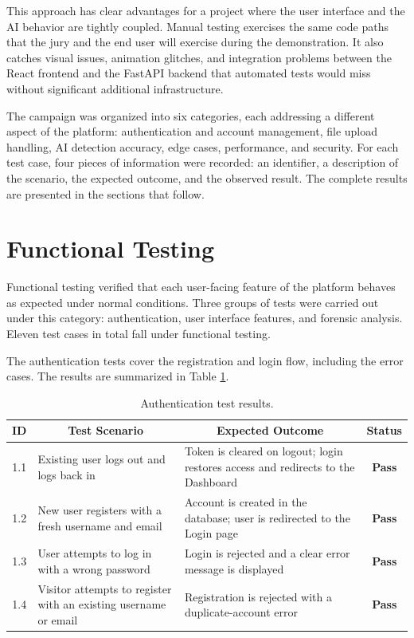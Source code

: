 This approach has clear advantages for a project where the user interface and the AI behavior are tightly coupled. Manual testing exercises the same code paths that the jury and the end user will exercise during the demonstration. It also catches visual issues, animation glitches, and integration problems between the React frontend and the FastAPI backend that automated tests would miss without significant additional infrastructure.

The campaign was organized into six categories, each addressing a different aspect of the platform: authentication and account management, file upload handling, AI detection accuracy, edge cases, performance, and security. For each test case, four pieces of information were recorded: an identifier, a description of the scenario, the expected outcome, and the observed result. The complete results are presented in the sections that follow.

\section{Functional Testing}

Functional testing verified that each user-facing feature of the platform behaves as expected under normal conditions. Three groups of tests were carried out under this category: authentication, user interface features, and forensic analysis. Eleven test cases in total fall under functional testing.

The authentication tests cover the registration and login flow, including the error cases. The results are summarized in Table \ref{tab:test-auth}.

\begin{table}[H]
\centering
\renewcommand{\arraystretch}{1.3}
\begin{tabular}{|c|p{5.8cm}|p{5.8cm}|c|}
\hline
\textbf{ID} & \multicolumn{1}{c|}{\textbf{Test Scenario}} & \multicolumn{1}{c|}{\textbf{Expected Outcome}} & \textbf{Status} \\
\hline
1.1 & Existing user logs out and logs back in & Token is cleared on logout; login restores access and redirects to the Dashboard & \textbf{Pass} \\
\hline
1.2 & New user registers with a fresh username and email & Account is created in the database; user is redirected to the Login page & \textbf{Pass} \\
\hline
1.3 & User attempts to log in with a wrong password & Login is rejected and a clear error message is displayed & \textbf{Pass} \\
\hline
1.4 & Visitor attempts to register with an existing username or email & Registration is rejected with a duplicate-account error & \textbf{Pass} \\
\hline
\end{tabular}
\caption{Authentication test results.}
\label{tab:test-auth}
\end{table}

